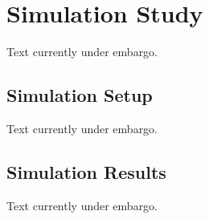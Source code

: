 \section{Simulation Study}
\label{c4:sec:sim_study}
Text currently under embargo.

\subsection{Simulation Setup}
Text currently under embargo.

\subsection{Simulation Results}
Text currently under embargo.